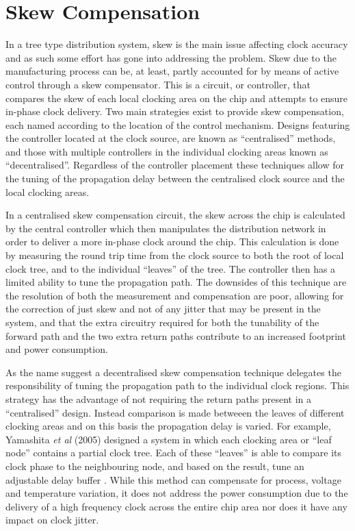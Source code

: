 \section{Skew Compensation}
In a tree type distribution system, skew is the main issue affecting clock accuracy and as such some effort has gone into addressing the problem. Skew due to the manufacturing process can be, at least, partly accounted for by means of active control through a skew compensator. This is a circuit, or controller, that compares the skew of each local clocking area on the chip and attempts to ensure in-phase clock delivery. Two main strategies exist to provide skew compensation, each named according to the location of the control mechanism. Designs featuring the controller located at the clock source, are known as ``centralised'' methods, and those with multiple controllers in the individual clocking areas known as ``decentralised''. Regardless of the controller placement these techniques allow for the tuning of the propagation delay between the centralised clock source and the local clocking areas.

In a centralised skew compensation circuit, the skew across the chip is calculated by the central controller which then manipulates the distribution network in order to deliver a more in-phase clock around the chip. This calculation is done by measuring the round trip time from the clock source to both the root of local clock tree, and to the individual ``leaves'' of the tree. The controller then has a limited ability to tune the propagation path. The downsides of this technique are the resolution of both the measurement and compensation are poor, allowing for the correction of just skew and not of any jitter that may be present in the system, and that the extra circuitry required for both the tunability of the forward path and the two extra return paths contribute to an increased footprint and power consumption.

As the name suggest a decentralised skew compensation technique delegates the responsibility of tuning the propagation path to the individual clock regions. This strategy has the advantage of not requiring the return paths present in a ``centralised'' design. Instead comparison is made betweeen the leaves of different clocking areas and on this basis the propagation delay is varied.
For example, Yamashita \textit{et al} (2005) designed a system in which each clocking area or ``leaf node'' contains a partial clock tree. Each of these ``leaves'' is able to compare its clock phase to the neighbouring node, and based on the result, tune an adjustable delay buffer \cite{yamashita2005dynamic}. While this method can compensate for process, voltage and temperature variation, it does not address the power consumption due to the delivery of a high frequency clock across the entire chip area nor does it have any impact on clock jitter.

